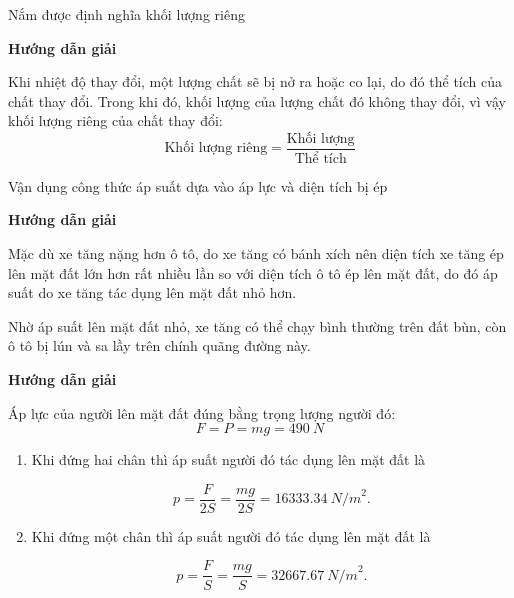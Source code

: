 \begin{dang}{Nắm được định nghĩa khối lượng riêng }
{\begin{center}
		\end{center}
	}
	{	\begin{center}
			\textbf{Hướng dẫn giải}
		\end{center}
		
		Khi nhiệt độ thay đổi, một lượng chất sẽ bị nở ra hoặc co lại, do đó thể tích của chất thay đổi. Trong khi đó, khối lượng của lượng chất đó không thay đổi, vì vậy khối lượng riêng của chất thay đổi:
		$$\text{Khối lượng riêng} = \dfrac{\text{Khối lượng}}{\text{Thể tích}}$$
		
	}
\end{dang}
\begin{dang}{Vận dụng công thức áp suất dựa vào áp lực và diện tích bị ép}
	{	\begin{center}
			\textbf{Hướng dẫn giải}
		\end{center}
		
		Mặc dù xe tăng nặng hơn ô tô, do xe tăng có bánh xích nên diện tích xe tăng ép lên mặt đất lớn hơn rất nhiều lần so với diện tích  ô tô ép lên mặt đất, do đó áp suất do xe tăng tác dụng lên mặt đất nhỏ hơn.
		
		Nhờ áp suất lên mặt đất nhỏ, xe tăng có thể chạy bình thường trên đất bùn, còn ô tô bị lún và sa lầy trên chính quãng đường này.
	}
	{	\begin{center}
			\textbf{Hướng dẫn giải}
		\end{center}
		
		Áp lực của người lên mặt đất đúng bằng trọng lượng người đó:
		$$F=P = mg = \SI{490}{N}$$
		
		\begin{enumerate}[label=\alph*)]
			\item 
			Khi đứng hai chân thì áp suất người đó tác dụng lên mặt đất là
			
			$$p = \dfrac{F}{2S} =\dfrac{mg}{2S}= \SI{16333,34}{N/m}^2.$$
			
			\item 
			Khi đứng một chân thì áp suất người đó tác dụng lên mặt đất là 
			
			$$p = \dfrac{F}{S} = \dfrac{mg}{S} = \SI{32667,67}{N/m}^2.$$
		\end{enumerate}
		
	}
\end{dang}
